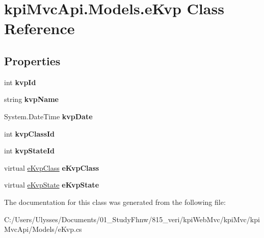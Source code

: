 \hypertarget{classkpi_mvc_api_1_1_models_1_1e_kvp}{}\section{kpi\+Mvc\+Api.\+Models.\+e\+Kvp Class Reference}
\label{classkpi_mvc_api_1_1_models_1_1e_kvp}
\subsection*{Properties}
\begin{DoxyCompactItemize}
\item 
\mbox{\label{classkpi_mvc_api_1_1_models_1_1e_kvp_a54711885ac704976abd6cdd7c73854f4}} 
int {\bfseries kvp\+Id}
\item 
\mbox{\label{classkpi_mvc_api_1_1_models_1_1e_kvp_ac7077b2c7a571312ed6e045654479530}} 
string {\bfseries kvp\+Name}
\item 
\mbox{\label{classkpi_mvc_api_1_1_models_1_1e_kvp_acc1df62c2f87bb2ab5b522f189b784fc}} 
System.\+Date\+Time {\bfseries kvp\+Date}
\item 
\mbox{\label{classkpi_mvc_api_1_1_models_1_1e_kvp_a89cd29a46a7e2db987eca1191bf0c7a0}} 
int {\bfseries kvp\+Class\+Id}
\item 
\mbox{\label{classkpi_mvc_api_1_1_models_1_1e_kvp_a835622d2cdae326e75fc66f396daca06}} 
int {\bfseries kvp\+State\+Id}
\item 
\mbox{\label{classkpi_mvc_api_1_1_models_1_1e_kvp_a9d8ab28be21d4e0e8e511de170cc47d8}} 
virtual \hyperlink{classkpi_mvc_api_1_1_models_1_1e_kvp_class}{e\+Kvp\+Class} {\bfseries e\+Kvp\+Class}
\item 
\mbox{\label{classkpi_mvc_api_1_1_models_1_1e_kvp_a63ab869f458a5a35e6a0787a87898191}} 
virtual \hyperlink{classkpi_mvc_api_1_1_models_1_1e_kvp_state}{e\+Kvp\+State} {\bfseries e\+Kvp\+State}
\end{DoxyCompactItemize}


The documentation for this class was generated from the following file\+:\begin{DoxyCompactItemize}
\item 
C\+:/\+Users/\+Ulysses/\+Documents/01\+\_\+\+Study\+Fhnw/815\+\_\+veri/kpi\+Web\+Mvc/kpi\+Mvc/kpi\+Mvc\+Api/\+Models/e\+Kvp.\+cs\end{DoxyCompactItemize}
